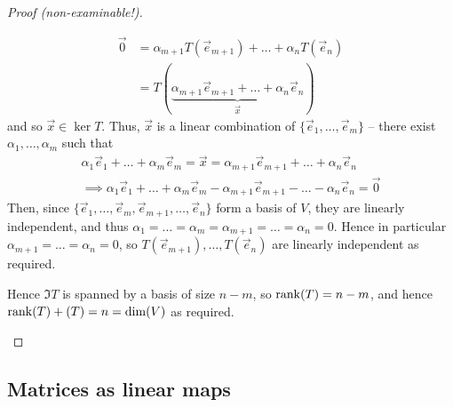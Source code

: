 \documentclass{../../template/note}
\begin{document}
\begin{proof}[Proof (non-examinable!)]
\begin{enumerate}
\begin{enumerate}
\begin{align*}
                    \vec 0 &= \alpha_{m+1} T(\vec e_{m+1})+ \dots + \alpha_n T(\vec e_n) \\
                    &= T(\underbrace{\alpha_{m+1} \vec e_{m+1}+ \dots + \alpha_n \vec e_n}_{\vec x})
                \end{align*}
                and so \(\vec x \in \ker T\). Thus, \(\vec x\) is a linear combination of \(\{\vec e_1, \dots, \vec e_m\}\) -- there exist \(\alpha_1, \dots, \alpha_m\) such that
                \begin{align*}
                    \alpha_1 \vec e_1 + \dots + \alpha_m \vec e_m = \vec x = \alpha_{m+1} \vec e_{m+1} + \dots + \alpha_n \vec e_n \\
                    \implies \alpha_1 \vec e_1 + \dots + \alpha_m \vec e_m - \alpha_{m+1} \vec e_{m+1} - \dots - \alpha_n \vec e_n = \vec 0
                \end{align*}
                Then, since \(\{\vec e_1, \dots, \vec e_m, \vec e_{m+1}, \dots, \vec e_n\}\) form a basis of \(V\), they are linearly independent, and thus \(\alpha_1 = \dots = \alpha_m = \alpha_{m+1} = \dots = \alpha_n = 0\). Hence in particular \(\alpha_{m+1} = \dots = \alpha_n = 0\), so \(T(\vec e_{m+1}), \dots, T(\vec e_n)\) are linearly independent as required.             
            \end{enumerate}
            Hence \(\Im T\) is spanned by a basis of size \(n-m\), so \(\operatorname{rank}(T) = n-m\), and hence \(\rank(T) + \null(T) = n = \dim(V)\) as required.
            
        \end{enumerate}
        
        
    \end{proof}
    
    \subsection{Matrices as linear maps}
\end{document}
